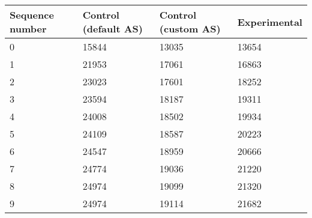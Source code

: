 \begin{center}
\begin{tabular}{|l|l|l|l|}
\hline
Sequence number & Control (default AS) & Control (custom AS) & Experimental \\
\hline
0 & 15844 & 13035 & 13654 \\
1 & 21953 & 17061 & 16863 \\
2 & 23023 & 17601 & 18252 \\
3 & 23594 & 18187 & 19311 \\
4 & 24008 & 18502 & 19934 \\
5 & 24109 & 18587 & 20223 \\
6 & 24547 & 18959 & 20666 \\
7 & 24774 & 19036 & 21220 \\
8 & 24974 & 19099 & 21320 \\
9 & 24974 & 19114 & 21682 \\
\hline
\end{tabular}
\end{center}
